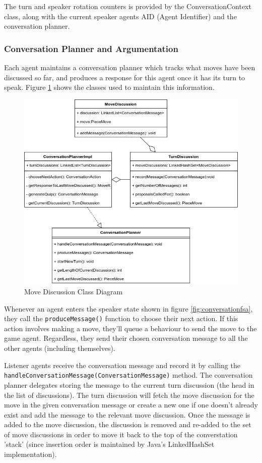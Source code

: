 \documentclass{article}
\begin{document}
The turn and speaker rotation counters is provided by the ConversationContext class, along with the current speaker agents AID (Agent Identifier) and the conversation planner. 

\subsubsection{Conversation Planner and Argumentation}

Each agent maintains a conversation planner which tracks what moves have been discussed so far, and produces a response for this agent once it has its turn to speak. Figure \ref{fig:movediscussion} shows the classes used to maintain this information.

\begin{figure}[]
	\centering
	\includegraphics[width=0.8\linewidth]{images/movediscussion}
	\caption{Move Discussion Class Diagram}
	\label{fig:movediscussion}
\end{figure}

Whenever an agent enters the speaker state shown in figure \ref{fig:conversationfsa}, they call the \lstinline{produceMessage()} function to choose their next action. If this action involves making a move, they'll queue a behaviour to send the move to the game agent. Regardless, they send their chosen conversation message to all the other agents (including themselves).

Listener agents receive the conversation message and record it by calling the \lstinline{handleConversationMessage(ConversationMessage)} method. The conversation planner delegates storing the message to the current turn discussion (the head in the list of discussions). The turn discussion will fetch the move discussion for the move in the given conversation message or create a new one if one doesn't already exist and add the message to the relevant move discussion. Once the message is added to the move discussion, the discussion is removed and re-added to the set of move discussions in order to move it back to the top of the converstation 'stack' (since insertion order is maintained by Java's LinkedHashSet implementation). 
\end{document}
